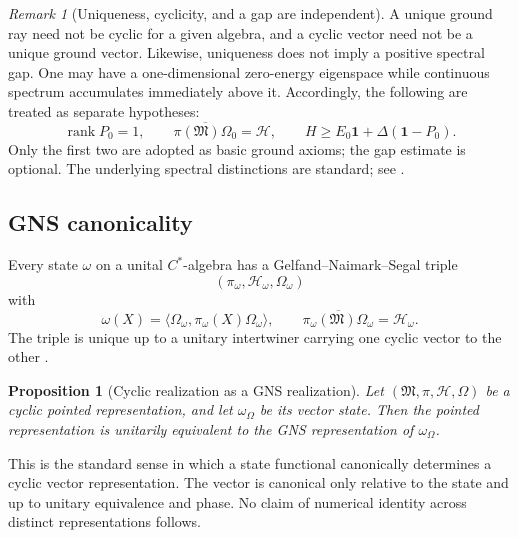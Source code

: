 \documentclass[11pt,reqno]{scrartcl}
\newcommand{\idop}{\mathbf 1}
\newcommand{\inner}[2]{\langle #1,#2\rangle}
\DeclareMathOperator{\rank}{rank}
\theoremstyle{plain}
\newtheorem{proposition}[proposition]{Proposition}
\theoremstyle{definition}
\theoremstyle{remark}
\newtheorem{remark}[remark]{Remark}
\begin{document}
\begin{remark}[Uniqueness, cyclicity, and a gap are independent]
\label{rem:ground-properties-independent}
A unique ground ray need not be cyclic for a given algebra, and a cyclic
vector need not be a unique ground vector.  Likewise, uniqueness does not
imply a positive spectral gap.  One may have a one-dimensional zero-energy
eigenspace while continuous spectrum accumulates immediately above it.
Accordingly, the following are treated as separate hypotheses:
\begin{equation}
  \rank P_0=1,
  \qquad
  \overline{\pi(\mathfrak M)\Omega_0}=\mathscr H,
  \qquad
  H\geq E_0\idop+\Delta(\idop-P_0).
\end{equation}
Only the first two are adopted as basic ground axioms; the gap estimate is
optional.
The underlying spectral distinctions are standard; see
\cite{Kato,ReedSimon}.
\end{remark}

\subsection{GNS canonicality}

Every state $\omega$ on a unital $C^*$-algebra has a Gelfand--Naimark--Segal
triple
\begin{equation}
  (\pi_{\omega},\mathscr H_{\omega},\Omega_{\omega})
\end{equation}
with
\begin{equation}
  \omega(X)
  =\inner{\Omega_{\omega}}{\pi_{\omega}(X)\Omega_{\omega}},
  \qquad
  \overline{\pi_{\omega}(\mathfrak M)\Omega_{\omega}}
  =\mathscr H_{\omega}.
\end{equation}
The triple is unique up to a unitary intertwiner carrying one cyclic vector
to the other \cite{BratteliRobinson}.

\begin{proposition}[Cyclic realization as a GNS realization]
\label{prop:cyclic-is-gns}
Let $(\mathfrak M,\pi,\mathscr H,\Omega)$ be a cyclic pointed
representation, and let $\omega_{\Omega}$ be its vector state.  Then the
pointed representation is unitarily equivalent to the GNS representation of
$\omega_{\Omega}$.
\end{proposition}

This is the standard sense in which a state functional canonically determines
a cyclic vector representation.  The vector is canonical only relative to the
state and up to unitary equivalence and phase.  No claim of numerical identity
across distinct representations follows.
\end{document}
